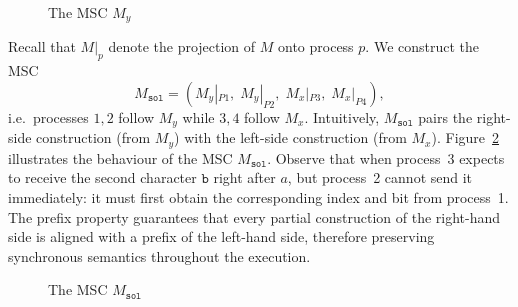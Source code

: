 \begin{example}
\begin{figure}[!ht]
\centering
\begin{msc}[draw frame=none, draw head=none, msc keyword=, head height=0px, label distance=0.5ex, foot height=0px, foot distance=0px]{}



\end{msc}
\caption{The MSC $M_y$}
\label{fig:exmp-my}
\end{figure}

Recall that \(M|_p\) denote the projection of \(M\) onto process \(p\). We
construct the MSC
\[
  M_{\texttt{sol}} = (M_y|_{P1},\; M_y|_{P2},\; M_x|_{P3},\; M_x|_{P4}),
\]
i.e.\ processes $1,2$ follow $M_y$ while $3,4$ follow $M_x$.
Intuitively, $M_{\texttt{sol}}$ pairs the right-side construction (from $M_y$)
with the left-side construction (from $M_x$). 
Figure~\ref{fig:exmp-msol} illustrates the behaviour of the MSC
$M_{\texttt{sol}}$. Observe that when process~3 expects to receive the
second character $\texttt{b}$ right after $a$, 
but process~2 cannot send it immediately:
it must first obtain the corresponding index and bit from process~1.
The prefix property guarantees
that every partial construction of the right-hand side is aligned with
a prefix of the left-hand side, therefore preserving synchronous
semantics throughout the execution.

\begin{figure}[!ht]
\centering
\begin{msc}[draw frame=none, draw head=none, msc keyword=, head height=0px, label distance=0.5ex, foot height=0px, foot distance=0px]{}


	
\end{msc}
\caption{The MSC $M_\texttt{sol}$}
\label{fig:exmp-msol}
\end{figure}

\end{example}

